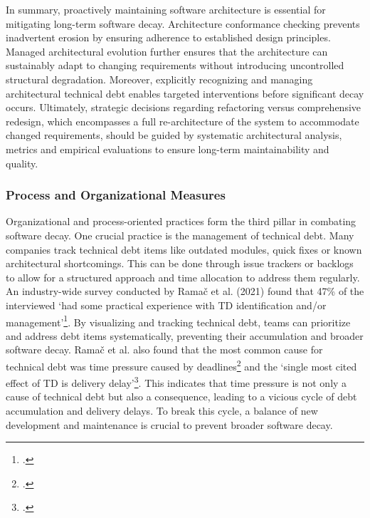 In summary, proactively maintaining software architecture is essential for mitigating long-term software decay. Architecture conformance checking 
prevents inadvertent erosion by ensuring adherence to established design principles. Managed architectural evolution further ensures that the architecture
can sustainably adapt to changing requirements without introducing uncontrolled structural degradation. Moreover, explicitly recognizing and managing architectural
technical debt enables targeted interventions before significant decay occurs. Ultimately, strategic decisions regarding refactoring versus comprehensive redesign, which encompasses a full re-architecture of the system to accommodate changed requirements, should be 
guided by systematic architectural analysis, metrics and empirical evaluations to ensure long-term maintainability and quality.

\subsubsection{Process and Organizational Measures}
Organizational and process-oriented practices form the third pillar in combating software decay.
One crucial practice is the management of technical debt. Many companies track technical debt items like outdated modules, quick fixes or known architectural shortcomings.
This can be done through issue trackers or backlogs to allow for a structured approach and time allocation to address them regularly.
An industry-wide survey conducted by Ramač et al. (2021) found that 47\% of the interviewed `had some practical experience with TD identification and/or management'\footcite[40]{ramacPrevalenceCommonCauses2021}.
By visualizing and tracking technical debt, teams can prioritize and address debt items systematically, preventing their accumulation and broader software decay.
Ramač et al. also found that the most common cause for technical debt was time pressure caused by deadlines\footcite[40]{ramacPrevalenceCommonCauses2021} and the `single most cited effect of TD is delivery delay'\footcite[40]{ramacPrevalenceCommonCauses2021}.
This indicates that time pressure is not only a cause of technical debt but also a consequence, leading to a vicious cycle of debt accumulation and delivery delays. To break this cycle, a balance of new development and maintenance is crucial to prevent broader software decay.

